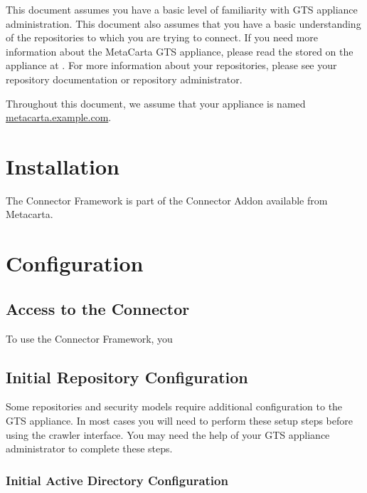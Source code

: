 \begin{changemargin}{1.5in}{0in}
This document assumes you have a basic level of familiarity with GTS
appliance administration. This document also assumes that you have a
basic understanding of the repositories to which you are trying to
connect. If you need more information about the MetaCarta GTS
appliance, please read the  stored on the appliance at
. For more
information about your repositories, please see your repository
documentation or repository administrator.

Throughout this document, we assume that your appliance is named \\
\url{metacarta.example.com}. 



\section{Installation}

The Connector Framework is part of the Connector Addon available from
Metacarta. 

\section{Configuration}

\subsection{Access to the Connector}

To use the Connector Framework, you 

\subsection{Initial Repository Configuration}

Some repositories and security models require additional configuration
to the GTS appliance. In most cases you will need to perform these
setup steps before using the crawler interface. You may need the help
of your GTS appliance administrator to complete these steps.

\subsubsection{Initial Active Directory Configuration}


\end{changemargin}
